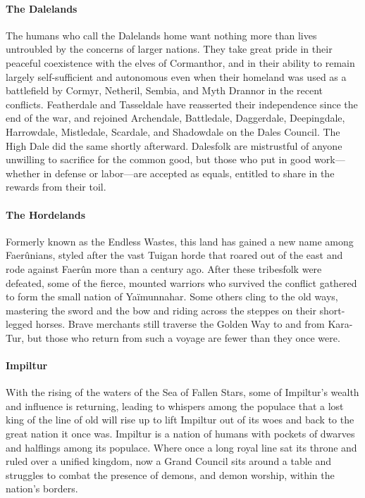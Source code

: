 \documentclass[10pt,a4paper,twoside,twocolumn,openany,bg=print,nodeprecatedcode]{dndbook}
\begin{document}
\paragraph{The Dalelands}
The humans who call the Dalelands home want nothing more than lives untroubled by the concerns of larger nations. They take great pride in their peaceful coexistence with the elves of Cormanthor, and in their ability to remain largely self-sufficient and autonomous even when their homeland was used as a battlefield by Cormyr, Netheril, Sembia, and Myth Drannor in the recent conflicts. Featherdale and Tasseldale have reasserted their independence since the end of the war, and rejoined Archendale, Battledale, Daggerdale, Deepingdale, Harrowdale, Mistledale, Scardale, and Shadowdale on the Dales Council. The High Dale did the same shortly afterward.
Dalesfolk are mistrustful of anyone unwilling to sacrifice for the common good, but those who put in good work—whether in defense or labor—are accepted as equals, entitled to share in the rewards from their toil.
\paragraph{The Hordelands}
Formerly known as the Endless Wastes, this land has gained a new name among Faerûnians, styled after the vast Tuigan horde that roared out of the east and rode against Faerûn more than a century ago. After these tribesfolk were defeated, some of the fierce, mounted warriors who survived the conflict gathered to form the small nation of Yaïmunnahar. Some others cling to the old ways, mastering the sword and the bow and riding across the steppes on their short-legged horses. Brave merchants still traverse the Golden Way to and from Kara-Tur, but those who return from such a voyage are fewer than they once were.
\paragraph{Impiltur}
With the rising of the waters of the Sea of Fallen Stars, some of Impiltur's wealth and influence is returning, leading to whispers among the populace that a lost king of the line of old will rise up to lift Impiltur out of its woes and back to the great nation it once was.
Impiltur is a nation of humans with pockets of dwarves and halflings among its populace. Where once a long royal line sat its throne and ruled over a unified kingdom, now a Grand Council sits around a table and struggles to combat the presence of demons, and demon worship, within the nation's borders.
\end{document}
